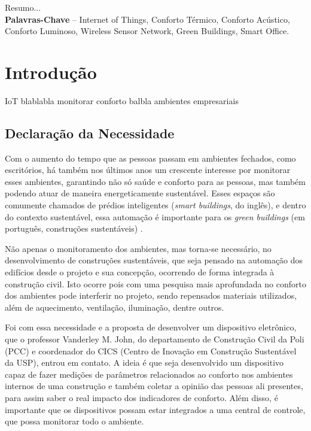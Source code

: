 \documentclass[]{politex}
\begin{document}
\capa
\folhaderosto


\begin{resumo}
Resumo...
%
\\[3\baselineskip]
%
\textbf{Palavras-Chave} -- Internet of Things, Conforto Térmico, Conforto Acústico, Conforto Luminoso, Wireless Sensor Network, Green Buildings, Smart Office.
\end{resumo}


\sumario



\part{Introdução}

IoT blablabla monitorar conforto balbla ambientes empresariais

\chapter{Declaração da Necessidade}

Com o aumento do tempo que as pessoas passam em ambientes fechados, como escritórios, há também nos últimos anos um crescente interesse por monitorar esses ambientes, garantindo não só saúde e conforto para as pessoas, mas também podendo atuar de maneira energeticamente sustentável. Esses espaços são comumente chamados de prédios inteligentes (\textit{smart buildings}, do inglês), e dentro do contexto sustentável, essa automação é importante para os \textit{green buildings} (em português, construções sustentáveis) \cite{GreenBuildings} \cite{EnergyBuildings}. 

Não apenas o monitoramento dos ambientes, mas torna-se necessário, no desenvolvimento de construções sustentáveis, que seja pensado na automação dos edifícios desde o projeto e sua concepção, ocorrendo de forma integrada à construção civil. Isto ocorre pois com uma pesquisa mais aprofundada no conforto dos ambientes pode interferir no projeto, sendo repensados materiais utilizados, além de aquecimento, ventilação, iluminação, dentre outros. 

Foi com essa necessidade e a proposta de desenvolver um dispositivo eletrônico, que o professor Vanderley M. John, do departamento de Construção Civil da Poli (PCC) e coordenador do CICS (Centro de Inovação em Construção Sustentável da USP)\cite{CICS}, entrou em contato. A ideia é que seja desenvolvido um dispositivo capaz de fazer medições de parâmetros relacionados ao conforto nos ambientes internos de uma construção e também coletar a opinião das pessoas ali presentes, para assim saber o real impacto dos indicadores de conforto. Além disso, é importante que os dispositivos possam estar integrados a uma central de controle, que possa monitorar todo o ambiente. 
\end{document}
